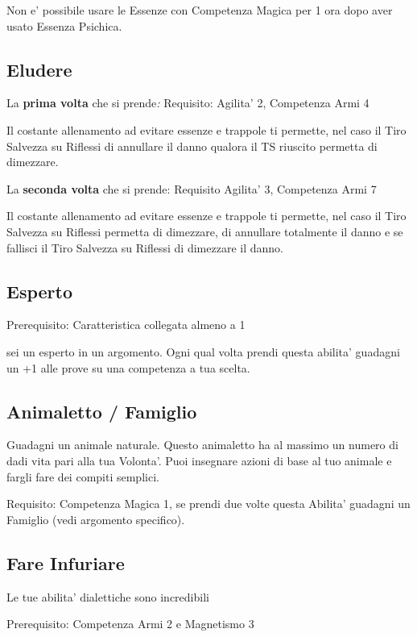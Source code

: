 \documentclass[a4paper,11pt,twoside,openany]{book}
\begin{document}
Non e' possibile usare le Essenze con Competenza Magica per 1 ora dopo aver usato Essenza Psichica.

\subsection{Eludere}

La \textbf{prima volta} che si prende\emph{:} Requisito: Agilita'
2, Competenza Armi 4

Il costante allenamento ad evitare essenze e trappole ti permette, nel caso il Tiro Salvezza su Riflessi di annullare il danno qualora il TS riuscito permetta di dimezzare.

La \textbf{seconda volta} che si prende: Requisito Agilita' 3, Competenza
Armi 7

Il costante allenamento ad evitare essenze e trappole ti permette, nel caso il Tiro Salvezza su Riflessi permetta di dimezzare, di annullare totalmente il danno e se fallisci il Tiro Salvezza su Riflessi di dimezzare il danno.

\subsection{Esperto}

Prerequisito: Caratteristica collegata almeno a 1

sei un esperto in un argomento. Ogni qual volta prendi questa abilita' guadagni un +1 alle prove su una competenza a tua scelta.

\subsection{Animaletto / Famiglio}

Guadagni un animale naturale. Questo animaletto ha al massimo un numero di dadi vita pari alla tua Volonta'. Puoi insegnare azioni di base al tuo animale e fargli fare dei compiti semplici.

Requisito: Competenza Magica 1, se prendi due volte questa Abilita' guadagni un Famiglio (vedi argomento specifico).

\subsection{Fare Infuriare}

Le tue abilita' dialettiche sono incredibili

Prerequisito: Competenza Armi 2 e Magnetismo 3
\end{document}
